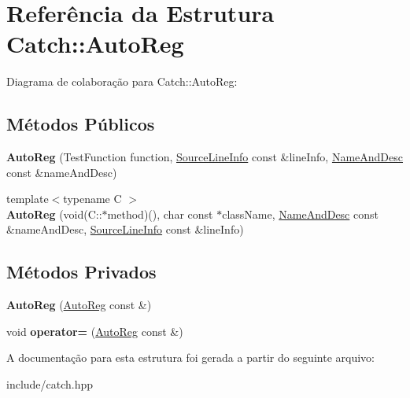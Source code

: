 \hypertarget{structCatch_1_1AutoReg}{}\section{Referência da Estrutura Catch\+:\+:Auto\+Reg}
\label{structCatch_1_1AutoReg}


Diagrama de colaboração para Catch\+:\+:Auto\+Reg\+:
\subsection*{Métodos Públicos}
\begin{DoxyCompactItemize}
\item 
{\bfseries Auto\+Reg} (Test\+Function function, \hyperlink{structCatch_1_1SourceLineInfo}{Source\+Line\+Info} const \&line\+Info, \hyperlink{structCatch_1_1NameAndDesc}{Name\+And\+Desc} const \&name\+And\+Desc)\hypertarget{structCatch_1_1AutoReg_af224f4568d57b8652474df475a164a8c}{}\label{structCatch_1_1AutoReg_af224f4568d57b8652474df475a164a8c}

\item 
{\footnotesize template$<$typename C $>$ }\\{\bfseries Auto\+Reg} (void(C\+::$\ast$method)(), char const $\ast$class\+Name, \hyperlink{structCatch_1_1NameAndDesc}{Name\+And\+Desc} const \&name\+And\+Desc, \hyperlink{structCatch_1_1SourceLineInfo}{Source\+Line\+Info} const \&line\+Info)\hypertarget{structCatch_1_1AutoReg_a1bf9207fe0a02b46dc0ab1cc03cbe738}{}\label{structCatch_1_1AutoReg_a1bf9207fe0a02b46dc0ab1cc03cbe738}

\end{DoxyCompactItemize}
\subsection*{Métodos Privados}
\begin{DoxyCompactItemize}
\item 
{\bfseries Auto\+Reg} (\hyperlink{structCatch_1_1AutoReg}{Auto\+Reg} const \&)\hypertarget{structCatch_1_1AutoReg_ae38af25c98b4a77832e826f9bb46cae9}{}\label{structCatch_1_1AutoReg_ae38af25c98b4a77832e826f9bb46cae9}

\item 
void {\bfseries operator=} (\hyperlink{structCatch_1_1AutoReg}{Auto\+Reg} const \&)\hypertarget{structCatch_1_1AutoReg_af94bea740b5d51e60b2d1d0de16e6709}{}\label{structCatch_1_1AutoReg_af94bea740b5d51e60b2d1d0de16e6709}

\end{DoxyCompactItemize}


A documentação para esta estrutura foi gerada a partir do seguinte arquivo\+:\begin{DoxyCompactItemize}
\item 
include/catch.\+hpp\end{DoxyCompactItemize}

